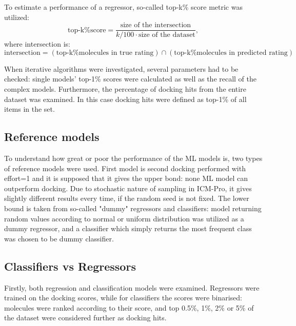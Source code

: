 To estimate a performance of a regressor, so-called top-k\% score metric was utilized:
\begin{equation*}
\text{top-k\% score} = \frac{\text{size of the intersection}}{k/100 \cdot \text{size of the dataset}},
\end{equation*}
where intersection is:
\begin{equation*}
         \text{intersection} = \left( \text{top-k\% molecules in true rating}\right) \cap \left( \text{top-k\% molecules in predicted rating}\right)
\end{equation*}

When iterative algorithms were investigated, several parameters had to be checked: 
single models' top-1\% scores were calculated as well as the recall of the complex 
models.
Furthermore, the percentage of docking hits from the entire dataset was examined.
In this case docking hits were defined as top-1\% of all items in the set.\\

\subsection{Reference models}
To understand how great or poor the performance of the ML models is, two types of 
reference models were used.
First model is second docking performed with effort=1 and it is supposed that it 
gives the upper bond: none ML model can outperform docking. 
Due to stochastic nature of sampling in ICM-Pro, it gives slightly different results every time, if the random seed is not fixed.
The lower bound is taken from so-called "dummy" regressors and classifiers: model returning 
random values according to normal or uniform distribution was utilized as a dummy 
regressor, and a classifier which simply returns the most frequent class was chosen 
to be dummy classifier.\\

\subsection{Classifiers vs Regressors}

Firstly, both regression and classification models were examined.
Regressors were trained on the docking scores, while for classifiers the scores were 
binarised: molecules were ranked according to their score, and top 0.5\%, 1\%, 2\% 
or 5\% of the dataset were considered further as docking hits.\\

